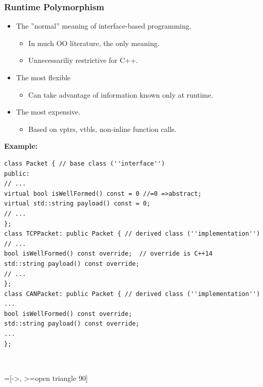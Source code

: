 \subsubsection{Runtime Polymorphism}
\begin{itemize}
  \item The ''normal'' meaning of interface-based programming.
  \begin{itemize}
    \item In much OO literature, the only meaning.
    \item Unnecessariliy restrictive for C++.
  \end{itemize}
  \item The most flexible
  \begin{itemize}
    \item Can take advantage of information known only at runtime.
  \end{itemize}
  \item The most expensive.
  \begin{itemize}
    \item Based on vptrs, vtbls, non-inline function calls.
  \end{itemize}
\end{itemize}
\textbf{Example:}
\begin{minipage}{11cm}
\begin{lstlisting}
class Packet { // base class (''interface'')
public:
// ...
virtual bool isWellFormed() const = 0 //=0 =>abstract;
virtual std::string payload() const = 0;
// ...
};
class TCPPacket: public Packet { // derived class (''implementation'')
// ...
bool isWellFormed() const override;  // override is C++14
std::string payload() const override;
// ...
};
class CANPacket: public Packet { // derived class (''implementation'')
...
bool isWellFormed() const override;
std::string payload() const override;
...
};
\end{lstlisting}
\end{minipage}~
\begin{minipage}{9cm}
=[->, >=open triangle 90]
\end{minipage}
